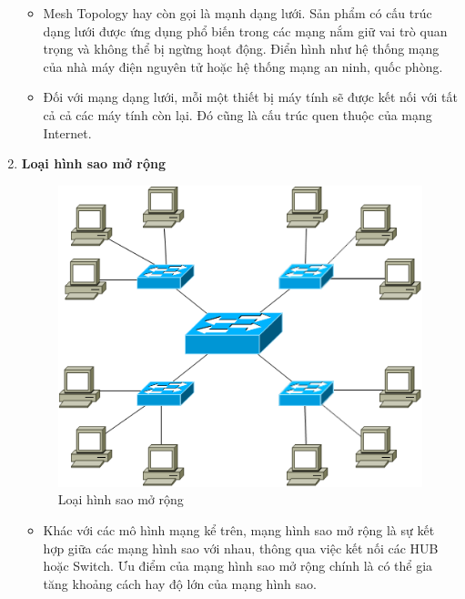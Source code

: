 \documentclass[13pt]{article}
\begin{document}
\begin{enumerate}
    \begin{itemize}
        \item Mesh Topology hay còn gọi là mạnh dạng lưới. Sản phẩm có cấu trúc dạng lưới được ứng dụng phổ biến trong các mạng nắm giữ vai trò quan trọng và không thể bị ngừng hoạt động. Điển hình như hệ thống mạng của nhà máy điện nguyên tử hoặc hệ thống mạng an ninh, quốc phòng.
        \item Đối với mạng dạng lưới, mỗi một thiết bị máy tính sẽ được kết nối với tất cả cả các máy tính còn lại. Đó cũng là cấu trúc quen thuộc của mạng Internet.
    \end{itemize}

    \item \textbf{Loại hình sao mở rộng}
    \begin{figure}[h!]
        \centering
        \includegraphics[width=0.7\linewidth]{image/9.png}
            \caption{Loại hình sao mở rộng}
            \label{fig:label1}
    \end{figure}
    
    \begin{itemize}
        \item Khác với các mô hình mạng kể trên, mạng hình sao mở rộng là sự kết hợp giữa các mạng hình sao với nhau, thông qua việc kết nối các HUB hoặc Switch. Ưu điểm của mạng hình sao mở rộng chính là có thể gia tăng khoảng cách hay độ lớn của mạng hình sao.
    \end{itemize}


\end{enumerate}
\end{document}
